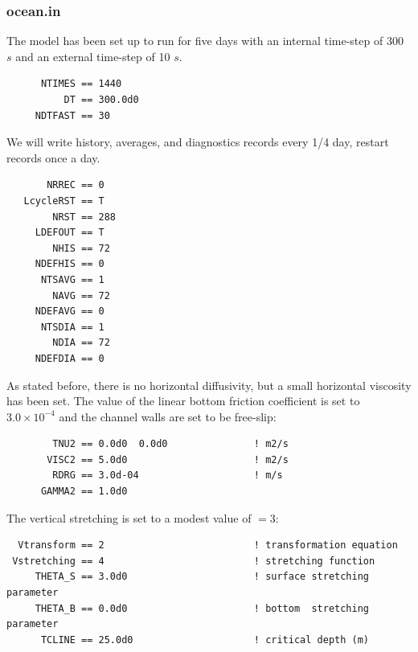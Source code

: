\subsubsection{ocean.in}
The model has been set up to run for five days with an internal time-step
of 300 $s$ and an external time-step of 10 $s$.
\begin{verbatim}
      NTIMES == 1440
          DT == 300.0d0
     NDTFAST == 30
\end{verbatim}
  We will write history, averages, and diagnostics
records every 1/4 day, restart records once a day.
\begin{verbatim}
       NRREC == 0
   LcycleRST == T
        NRST == 288
     LDEFOUT == T
        NHIS == 72
     NDEFHIS == 0
      NTSAVG == 1
        NAVG == 72
     NDEFAVG == 0
      NTSDIA == 1
        NDIA == 72
     NDEFDIA == 0
\end{verbatim}
As stated before, there is no horizontal diffusivity, but a small
horizontal viscosity has been set. The value of the linear bottom
friction coefficient  is set to $3.0 \times 10^{-4}$ and the
channel walls are set to be free-slip:
\begin{verbatim}
        TNU2 == 0.0d0  0.0d0               ! m2/s
       VISC2 == 5.0d0                      ! m2/s
        RDRG == 3.0d-04                    ! m/s
      GAMMA2 == 1.0d0
\end{verbatim}
The vertical stretching is set to a modest value of
$=3$:
\begin{verbatim}
  Vtransform == 2                          ! transformation equation
 Vstretching == 4                          ! stretching function
     THETA_S == 3.0d0                      ! surface stretching parameter
     THETA_B == 0.0d0                      ! bottom  stretching parameter
      TCLINE == 25.0d0                     ! critical depth (m)
\end{verbatim}

